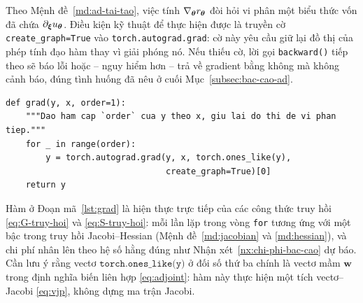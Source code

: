 Theo Mệnh đề~\ref{md:ad-tai-tao}, việc tính $\nabla_{\bm{\theta}}r_{\bm{\theta}}$ đòi hỏi
vi phân một biểu thức vốn đã chứa $\partial_{\bm{\xi}}u_{\bm{\theta}}$. Điều kiện kỹ thuật
để thực hiện được là truyền cờ \texttt{create\_graph=True} vào
\texttt{torch.autograd.grad}: cờ này yêu cầu giữ lại đồ thị của phép tính đạo hàm
thay vì giải phóng nó. Nếu thiếu cờ, lời gọi \texttt{backward()} tiếp theo sẽ báo
lỗi hoặc -- nguy hiểm hơn -- trả về gradient bằng không mà không cảnh báo, đúng
tình huống đã nêu ở cuối Mục~\ref{subsec:bac-cao-ad}.
 
\begin{lstlisting}[caption={Toán tử đạo hàm lồng nhau theo biến đầu vào.},label={lst:grad}]
def grad(y, x, order=1):
    """Dao ham cap `order` cua y theo x, giu lai do thi de vi phan tiep."""
    for _ in range(order):
        y = torch.autograd.grad(y, x, torch.ones_like(y),
                                create_graph=True)[0]
    return y
\end{lstlisting}
 
Hàm ở Đoạn mã~\ref{lst:grad} là hiện thực trực tiếp của các công thức truy hồi
\eqref{eq:G-truy-hoi} và \eqref{eq:S-truy-hoi}: mỗi lần lặp trong vòng
\texttt{for} tương ứng với một bậc trong truy hồi Jacobi--Hessian
(Mệnh đề~\ref{md:jacobian} và \ref{md:hessian}), và chi phí nhân lên theo hệ số
hằng đúng như Nhận xét~\ref{nx:chi-phi-bac-cao} dự báo. Cần lưu ý rằng vectơ
$\texttt{torch.ones\_like(y)}$ ở đối số thứ ba chính là vectơ mầm $\bm{w}$ trong
định nghĩa biến liên hợp \eqref{eq:adjoint}: hàm này thực hiện một tích
vectơ--Jacobi \eqref{eq:vjp}, không dựng ma trận Jacobi.

